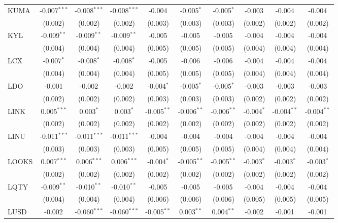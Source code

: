 \begin{table}[!htbp]
\begin{tabular}{@{\extracolsep{5pt}}lccccccccc}
 KUMA & -0.007$^{***}$ & -0.008$^{***}$ & -0.008$^{***}$ & -0.004$^{}$ & -0.005$^{*}$ & -0.005$^{*}$ & -0.003$^{}$ & -0.004$^{}$ & -0.004$^{}$ \\
  & (0.002) & (0.002) & (0.002) & (0.003) & (0.003) & (0.003) & (0.002) & (0.002) & (0.002) \\
 KYL & -0.009$^{**}$ & -0.009$^{**}$ & -0.009$^{**}$ & -0.005$^{}$ & -0.005$^{}$ & -0.005$^{}$ & -0.004$^{}$ & -0.004$^{}$ & -0.004$^{}$ \\
  & (0.004) & (0.004) & (0.004) & (0.005) & (0.005) & (0.005) & (0.004) & (0.004) & (0.004) \\
 LCX & -0.007$^{*}$ & -0.008$^{*}$ & -0.008$^{*}$ & -0.005$^{}$ & -0.006$^{}$ & -0.006$^{}$ & -0.004$^{}$ & -0.004$^{}$ & -0.004$^{}$ \\
  & (0.004) & (0.004) & (0.004) & (0.005) & (0.005) & (0.005) & (0.004) & (0.004) & (0.004) \\
 LDO & -0.001$^{}$ & -0.002$^{}$ & -0.002$^{}$ & -0.004$^{*}$ & -0.005$^{*}$ & -0.005$^{*}$ & -0.003$^{}$ & -0.003$^{}$ & -0.003$^{}$ \\
  & (0.002) & (0.002) & (0.002) & (0.003) & (0.003) & (0.003) & (0.002) & (0.002) & (0.002) \\
 LINK & 0.005$^{***}$ & 0.003$^{*}$ & 0.003$^{*}$ & -0.005$^{**}$ & -0.006$^{**}$ & -0.006$^{**}$ & -0.004$^{*}$ & -0.004$^{**}$ & -0.004$^{**}$ \\
  & (0.002) & (0.002) & (0.002) & (0.002) & (0.002) & (0.002) & (0.002) & (0.002) & (0.002) \\
 LINU & -0.011$^{***}$ & -0.011$^{***}$ & -0.011$^{***}$ & -0.004$^{}$ & -0.004$^{}$ & -0.004$^{}$ & -0.004$^{}$ & -0.004$^{}$ & -0.004$^{}$ \\
  & (0.003) & (0.003) & (0.003) & (0.005) & (0.005) & (0.005) & (0.004) & (0.004) & (0.004) \\
 LOOKS & 0.007$^{***}$ & 0.006$^{***}$ & 0.006$^{***}$ & -0.004$^{*}$ & -0.005$^{**}$ & -0.005$^{**}$ & -0.003$^{*}$ & -0.003$^{*}$ & -0.003$^{*}$ \\
  & (0.002) & (0.002) & (0.002) & (0.002) & (0.002) & (0.002) & (0.002) & (0.002) & (0.002) \\
 LQTY & -0.009$^{**}$ & -0.010$^{**}$ & -0.010$^{**}$ & -0.005$^{}$ & -0.005$^{}$ & -0.005$^{}$ & -0.004$^{}$ & -0.004$^{}$ & -0.004$^{}$ \\
  & (0.004) & (0.004) & (0.004) & (0.006) & (0.006) & (0.006) & (0.005) & (0.005) & (0.005) \\
 LUSD & -0.002$^{}$ & -0.060$^{***}$ & -0.060$^{***}$ & -0.005$^{**}$ & 0.003$^{**}$ & 0.004$^{**}$ & -0.002$^{}$ & -0.001$^{}$ & -0.001$^{}$ \\

\end{tabular}
\end{table}
